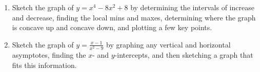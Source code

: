\begin{enumerate}
\item Sketch the graph of $y = x^4 - 8x^2 + 8$ by determining the intervals of increase and decrease, finding the local mins and maxes, determining where the graph is concave up and concave down, and plotting a few key points.


\item Sketch the graph of $y = \frac{x-1}{x^2-9}$ by graphing any vertical and horizontal asymptotes, finding the $x$- and
$y$-intercepts, and then sketching a graph that fits this information.

\end{enumerate}
